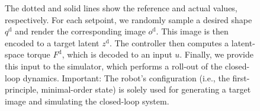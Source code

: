 \begin{figure}[ht]
{    The dotted and solid lines show the reference and actual values, respectively.
    For each setpoint, we randomly sample a desired shape $q^\mathrm{d}$ and render the corresponding image $o^\mathrm{d}$. This image is then encoded to a target latent $z^\mathrm{d}$. The controller then computes a latent-space torque $F^\mathrm{d}$, which is decoded to an input $u$. Finally, we provide this input to the simulator, which performs a roll-out of the closed-loop dynamics.
    Important: The robot's configuration (i.e., the first-principle, minimal-order state) is solely used for generating a target image and simulating the closed-loop system. 
    }\label{fig:apx-con:control:pcc_ns-2:mech_node_psatid_results}
\end{figure}


\begin{figure}[ht]
    \centering
    \\

\end{figure}
